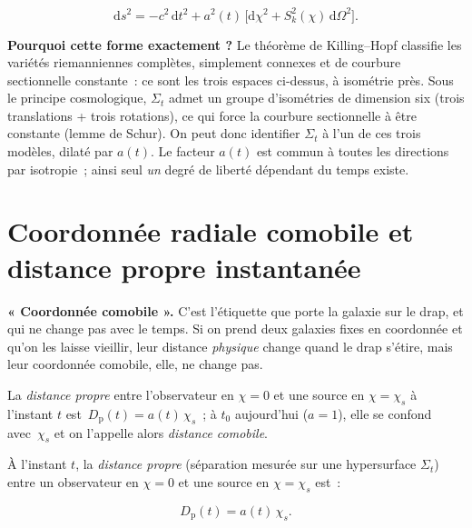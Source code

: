 \documentclass[11pt,a4paper,openany]{report}
\newcommand{\dif}{\mathrm{d}}
\begin{document}
\begin{equation}
\boxed{\;\dif s^{2} = -c^{2}\,\dif t^{2} + a^{2}(t)\,\bigl[\dif\chi^{2}
+ S_{k}^{2}(\chi)\,\dif\Omega^{2}\bigr].\;}
\label{eq:FLRW}
\end{equation}

\begin{tcolorbox}[approfondir]
\textbf{Pourquoi cette forme exactement ?} Le théorème de Killing--Hopf classifie
les variétés riemanniennes complètes, simplement connexes et de courbure
sectionnelle constante~: ce sont les trois espaces ci-dessus, à isométrie près.
Sous le principe cosmologique, $\Sigma_t$ admet un groupe d'isométries de
dimension six (trois translations + trois rotations), ce qui force la courbure
sectionnelle à être constante (lemme de Schur). On peut donc identifier $\Sigma_t$
à l'un de ces trois modèles, dilaté par $a(t)$. Le facteur $a(t)$ est commun
à toutes les directions par isotropie~; ainsi seul \emph{un} degré de liberté
dépendant du temps existe.
\end{tcolorbox}

\section{Coordonnée radiale comobile et distance propre instantanée}

\begin{tcolorbox}[vulgarisation]
\textbf{« Coordonnée comobile ».} C'est l'étiquette que porte la galaxie sur le
drap, et qui ne change pas avec le temps. Si on prend deux galaxies fixes en
coordonnée et qu'on les laisse vieillir, leur distance \emph{physique} change
quand le drap s'étire, mais leur coordonnée comobile, elle, ne change pas.
\end{tcolorbox}

\begin{tcolorbox}[mathspe]
La \emph{distance propre} entre l'observateur en $\chi=0$ et une source en
$\chi=\chi_s$ à l'instant $t$ est~$D_{\text{p}}(t) = a(t)\,\chi_s$~; à $t_0$
aujourd'hui ($a=1$), elle se confond avec~$\chi_s$ et on l'appelle alors
\emph{distance comobile}.
\end{tcolorbox}

À l'instant $t$, la \emph{distance propre} (séparation mesurée sur une
hypersurface $\Sigma_t$) entre un observateur en $\chi=0$ et une source en
$\chi=\chi_{s}$ est~:

\begin{equation}
D_{\text{p}}(t) = a(t)\,\chi_{s}.
\label{eq:Dp}
\end{equation}
\end{document}
